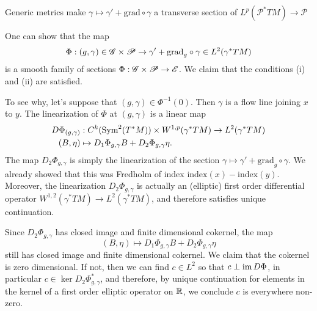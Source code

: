 \documentclass{amsart}
\begin{document}
\begin{clear}{Generic metrics make $\gamma\mapsto
    \gamma'+\text{grad}\circ \gamma$ a transverse section of
    $L^{p}(\mathscr{P}^{*}TM)\to \mathscr{P}$}
\begin{example}
    One can show that the map
    \begin{equation*}
      \Phi:(g,\gamma)\in \mathscr{G}\times \mathscr{P}\to
      \gamma'+\text{grad}_{g}\circ \gamma \in L^{2}(\gamma^{*}TM)
    \end{equation*}
    is a smooth family of sections
    $\Phi:\mathscr{G}\times \mathscr{P}\to \mathscr{E}$. We claim that
    the conditions (i) and (ii) are satisfied.

    To see why, let's suppose that $(g,\gamma)\in \Phi^{-1}(0)$. Then
    $\gamma$ is a flow line joining $x$ to $y$. The linearization of
    $\Phi$ at $(g,\gamma)$ is a linear map
    \begin{equation*}
      \begin{aligned}
        D\Phi_{(g,\gamma)}&:C^{k}(\text{Sym}^{2}(T^{*}M))\times
        W^{1,p}(\gamma^{*}TM)\to L^{2}(\gamma^{*}TM)\\
        (B,\eta)&\mapsto D_{1}\Phi_{g,\gamma}B+D_{2}\Phi_{g,\gamma}\eta.
      \end{aligned}
    \end{equation*}
    The map $D_{2}\Phi_{g,\gamma}$ is simply the linearization of the
    section $\gamma\mapsto \gamma'+\text{grad}_{g}\circ \gamma$. We
    already showed that this was Fredholm of index
    $\text{index}(x)-\text{index}(y)$. Moreover, the linearization
    $D_{2}\Phi_{g,\gamma}$ is actually an (elliptic) first order
    differential operator
    $W^{1,2}(\gamma^{*}TM)\to L^{2}(\gamma^{*}TM)$, and therefore
    satisfies unique continuation.

    Since $D_{2}\Phi_{g,\gamma}$ has closed image and finite
    dimensional cokernel, the map
    $$(B,\eta)\mapsto D_{1}\Phi_{g,\gamma}B+D_{2}\Phi_{g,\gamma}\eta$$
    still has closed image and finite dimensional cokernel. We claim
    that the cokernel is zero dimensional. If not, then we can find
    $c\in L^{2}$ so that $c\perp \operatorname{\mathrm{im}} D\Phi$, in particular $c\in \ker
    D_{2}\Phi_{g,\gamma}^{*}$, and therefore, by unique continuation
    for elements in the kernel of a first order elliptic operator on
    $\mathbb{R}$, we conclude $c$ is everywhere non-zero.


\end{example}
\end{clear}
\end{document}
